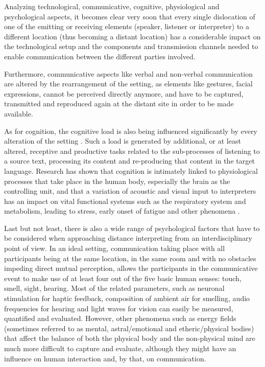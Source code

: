 \documentclass[output=paper]{langsci/langscibook}
\begin{document}
Analyzing technological, communicative, cognitive, physiological and psychological aspects, it becomes clear very soon that every single dislocation of one of the emitting or receiving elements (speaker, listener or interpreter) to a different location (thus becoming a distant location) has a considerable impact on the technological setup and the components and transmission channels needed to enable communication between the different parties involved. 

Furthermore, communicative aspects like verbal and non-verbal communication are altered by the rearrangement of the setting, as elements like gestures, facial expressions, cannot be perceived directly anymore, and have to be captured, transmitted and reproduced again at the distant site in order to be made available.

As for cognition, the cognitive load is also being influenced significantly by every alteration of the setting \citep{Moser-Mercer2005}. Such a load is generated by additional, or at least altered, receptive and productive tasks related to the sub-processes of listening to a source text, processing its content and re-producing that content in the target language. Research has shown that cognition is intimately linked to physiological processes that take place in the human body, especially the brain as the controlling unit, and that a variation of acoustic and visual input to interpreters has an impact on vital functional systems such as the respiratory system and metabolism, leading to stress, early onset of fatigue and other phenomena \citep{Moser-Mercer2003}.

Last but not least, there is also a wide range of psychological factors that have to be considered when approaching distance interpreting from an interdisciplinary point of view. In an ideal setting, communication taking place with all participants being at the same location, in the same room and with no obstacles impeding direct mutual perception, allows the participants in the communicative event to make use of at least four out of the five basic human senses: touch, smell, sight, hearing. Most of the related parameters, such as neuronal stimulation for haptic feedback, composition of ambient air for smelling, audio frequencies for hearing and light waves for vision can easily be measured, quantified and evaluated. However, other phenomena such as energy fields (sometimes referred to as mental, astral/emotional and etheric/physical bodies) that affect the balance of both the physical body and the non-physical mind are much more difficult to capture and evaluate, although they might have an influence on human interaction and, by that, on communication.
\end{document}
